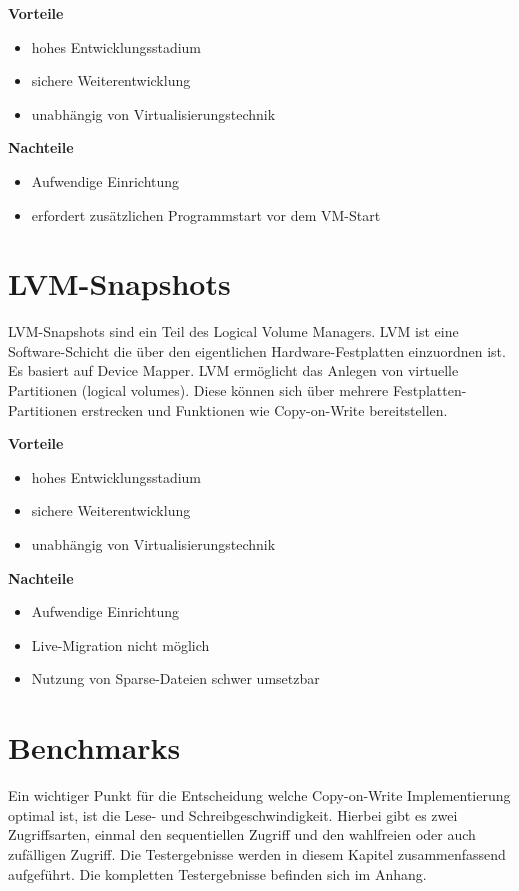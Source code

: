 \textbf{Vorteile}
\begin{itemize}
 \item hohes Entwicklungsstadium
 \item sichere Weiterentwicklung
 \item unabhängig von Virtualisierungstechnik
\end{itemize}

\textbf{Nachteile}
\begin{itemize}
 \item Aufwendige Einrichtung
 \item erfordert zusätzlichen Programmstart vor dem VM-Start
\end{itemize}

\section{LVM-Snapshots}
LVM-Snapshots sind ein Teil des Logical Volume Managers. LVM ist eine Software-Schicht die über den eigentlichen Hardware-Festplatten einzuordnen ist. Es basiert auf Device Mapper. LVM ermöglicht das Anlegen von virtuelle Partitionen (logical volumes). Diese können sich über mehrere Festplatten-Partitionen erstrecken und Funktionen wie Copy-on-Write bereitstellen. \cite{lvmhowto} \cite{lvmselflinux} \cite{lvmsource}

\textbf{Vorteile}
\begin{itemize}
 \item hohes Entwicklungsstadium
 \item sichere Weiterentwicklung
 \item unabhängig von Virtualisierungstechnik
\end{itemize}

\textbf{Nachteile}
\begin{itemize}
 \item Aufwendige Einrichtung
 \item Live-Migration nicht möglich
 \item Nutzung von Sparse-Dateien schwer umsetzbar
\end{itemize}

\section{Benchmarks}
Ein wichtiger Punkt für die Entscheidung welche Copy-on-Write Implementierung optimal ist, ist die Lese- und Schreibgeschwindigkeit. Hierbei gibt es zwei Zugriffsarten, einmal den sequentiellen Zugriff und den wahlfreien oder auch zufälligen Zugriff. Die Testergebnisse werden in diesem Kapitel zusammenfassend aufgeführt. Die kompletten Testergebnisse befinden sich im Anhang.

